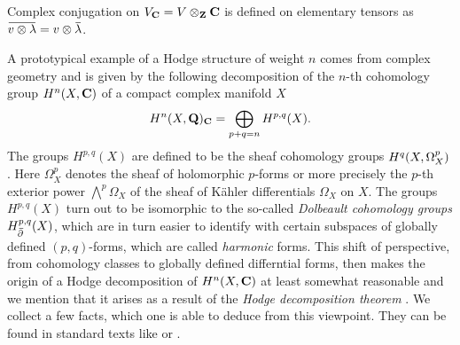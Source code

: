 \begin{remark}
    Complex conjugation on $V_\mathbf C = V \otimes_\mathbf Z \mathbf C$ is defined on elementary tensors as $\ols{v \otimes \lambda} = v \otimes \ols{\lambda}$.
\end{remark}

A prototypical example of a Hodge structure of weight $n$ comes from complex geometry and is given by the following decomposition of the $n$-th cohomology group $H^{n}(X, \mathbf C)$ of a compact complex manifold $X$
\[
    H^n(X, \mathbf Q)_\mathbf C = \bigoplus_{p+q = n} H^{p,q}(X).
\]
The groups $H^{p,q}(X)$ are defined to be the sheaf cohomology groups $H^{q}(X, \Omega_X^p)$. 
Here $\Omega_X^p$ denotes the sheaf of holomorphic $p$-forms or more precisely the $p$-th exterior power $\bigwedge^p \Omega_X$ of the sheaf of Kähler differentials $\Omega_X$ on $X$. 
The groups $H^{p,q}(X)$ turn out to be isomorphic to the so-called \emph{Dolbeault cohomology groups} $H^{p,q}_{\,\overline{\!{\partial}}}(X)$, which are in turn easier to identify with certain subspaces of globally defined $(p,q)$-forms, which are called \emph{harmonic} forms. This shift of perspective, from cohomology classes to globally defined differntial forms, then makes the origin of a Hodge decomposition of $H^{n}(X, \mathbf C)$ at least somewhat reasonable and we mention that it arises as a result of the \emph{Hodge decomposition theorem} \cite[\S 0.6]{GriffithsHarris1994}.
We collect a few facts, which one is able to deduce from this viewpoint. They can be found in standard texts like \cite{GriffithsHarris1994} or \cite{Voisin2002}.
